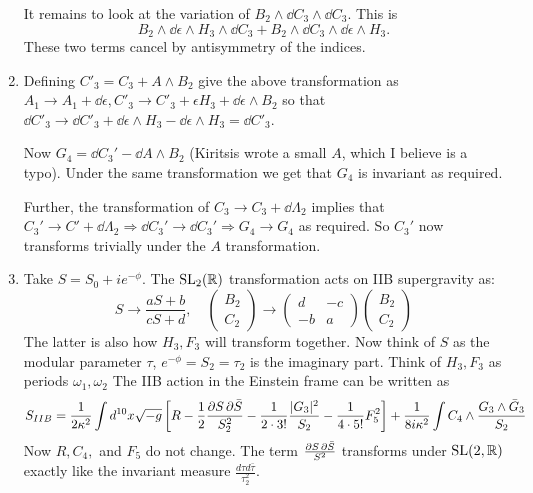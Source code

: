 \documentclass[11pt, class=article, crop=false]{standalone}
\begin{document}
\begin{enumerate}
	It remains to look at the variation of $B_2 \wedge \dd C_3 \wedge \dd C_3$. This is
	\[
	B_2 \wedge \dd \epsilon \wedge H_3 \wedge \dd C_3 + B_2 \wedge \dd C_3 \wedge \dd \epsilon \wedge H_3.	
	\]
	 These two terms cancel by antisymmetry of the indices.
	
	\item Defining $C'_3 = C_3 + A \wedge B_2$ give the above transformation as $A_1 \to A_1 + \dd \epsilon, C'_3 \to C'_3 + \epsilon H_3 + \dd \epsilon \wedge B_2$ so that $\dd C'_3 \to \dd C'_3 + \dd \epsilon \wedge H_3 - \dd \epsilon \wedge H_3 = \dd C'_3$. 
	
	Now $G_4 = \dd C_3' - \dd A \wedge B_2$ (Kiritsis wrote a small $A$, which I believe is a typo). Under the same transformation we get that $G_4$ is invariant as required. 
	
	Further, the transformation of $C_3 \to C_3 + \dd \Lambda_2$ implies that $C_3' \to C' + \dd \Lambda_2 \Rightarrow \dd C_3' \to \dd C_3' \Rightarrow G_4 \to G_4$ as required. So $C_3'$ now transforms trivially under the $A$ transformation.
	
	\item Take $S = S_0 + i e^{-\phi}$. The $\mathrm{SL}_2(\mathbb{R})$ transformation acts on IIB supergravity as:
	\[
		S \to \frac{a S + b}{c S + d}, \quad \begin{pmatrix}
			B_2\\
			C_2
		\end{pmatrix}
		\to \begin{pmatrix}
			d & -c\\
			-b & a
		\end{pmatrix} \begin{pmatrix}
			B_2 \\ 
			C_2
		\end{pmatrix}
	\]
	The latter is also how $H_3, F_3$ will transform together. Now think of $S$ as the modular parameter $\tau$, $e^{-\phi}= S_2 = \tau_2$ is the imaginary part. Think of $H_3, F_3$ as periods $\omega_1, \omega_2$ The IIB action in the Einstein frame can be written as
	\[
		S_{IIB} = \frac{1}{2\kappa^2} \int d^{10} x \sqrt{-g} \left[R - \frac12 \frac{\partial S\, \partial \bar S}{S_2^2} - \frac1{2\cdot 3!} \frac{|G_3|^2}{S_2} -\frac{1}{4 \cdot 5!} F_5^2 \right] + \frac{1}{8 i \kappa^2} \int C_4 \wedge \frac{G_3 \wedge \bar G_3}{S_2}
	\]
	Now $R, C_4,$ and $F_5$ do not change. The term $\frac{\partial S\, \partial \bar S}{S^2}$ transforms under $\mathrm{SL}(2, \mathbb{R})$ exactly like the invariant measure $\frac{d\tau d \bar \tau}{\tau^2_2}$. 
	

\end{enumerate}
\end{document}
